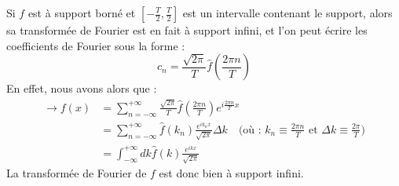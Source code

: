 \documentclass[../notesdecours.tex]{subfiles}
\begin{document}
\begin{remark}
Si $f$ est à support borné et $ \left[ -\frac{T}{2},\frac{T}{2} \right] $ est un intervalle contenant le support, alors sa transformée de Fourier est 
en fait à support infini, et l'on peut écrire les coefficients de Fourier sous la forme : 
    \begin{equation}
    c_n = \frac{\sqrt{2\pi}}{T}\hat{f} \left( \frac{2\pi n}{T} \right) 
    \end{equation}
En effet, nous avons alors que :
    \begin{align}
\rightarrow f(x) &= \sum_{n = -\infty}^{+\infty} \frac{\sqrt{2\pi}}{T}\hat{f} \left( \frac{2\pi n}{T} \right) e^{i\frac{2\pi n}{T}x}\\
&= \sum_{n = -\infty}^{+\infty} \hat{f}(k_n)\frac{e^{ik_nx}}{\sqrt{2\pi}} \Delta k \quad \mbox{(où : $k_n \equiv \frac{2\pi n}{T}$ et $\Delta k \equiv \frac{2\pi}{T}$)}\\
&= \int_{-\infty}^{+\infty} dk \hat{f}(k) \frac{e^{ikx}}{\sqrt{2\pi}}
    \end{align}
La transformée de Fourier de $f$ est donc bien à support infini. 
\end{remark}
\end{document}
